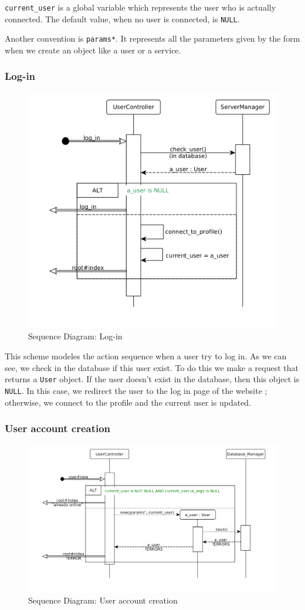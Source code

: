 \texttt{current\_user} is a global variable which represents the user who is actually connected. The default value, when no user is connected, is \texttt{NULL}.

Another convention is \texttt{params*}. It represents all the parameters given by the form when we create an object like a user or a service.

\subsubsection{Log-in}

\begin{figure}[H]
	\begin{center}
		\includegraphics[width=.45\textwidth]{log_in.png} %
		\caption{Sequence Diagram: Log-in}
		\label{fig:login}
	\end{center}
\end{figure}

This scheme modeles the action sequence when a user try to log in. As we can see, we check in
the database if this user exist. To do this we make a request that returns a \texttt{User} object. If
the user doesn't exist in the database, then this object is \texttt{NULL}. In this case,
we redirect the user to the log in page of the website ; otherwise, we connect to the profile and the current user is updated.

\subsubsection{User account creation}

\begin{figure}[H]
	\begin{center}
		\includegraphics[width=.7\textwidth]{user_new.png} %
		\caption{Sequence Diagram: User account creation}
		\label{fig:newuser}
	\end{center}
\end{figure}

